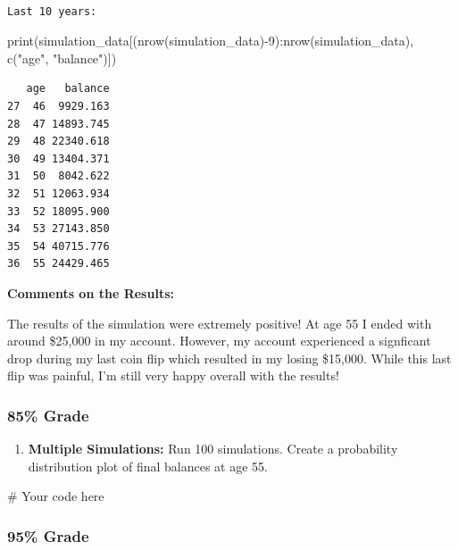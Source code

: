 \documentclass[
  letterpaper,
  DIV=11,
  numbers=noendperiod]{scrartcl}
\newenvironment{Shaded}{\begin{snugshade}}{\end{snugshade}}
\newcommand{\CommentTok}[1]{\textcolor[rgb]{0.37,0.37,0.37}{#1}}
\newcommand{\DecValTok}[1]{\textcolor[rgb]{0.68,0.00,0.00}{#1}}
\newcommand{\FunctionTok}[1]{\textcolor[rgb]{0.28,0.35,0.67}{#1}}
\newcommand{\NormalTok}[1]{\textcolor[rgb]{0.00,0.23,0.31}{#1}}
\newcommand{\SpecialCharTok}[1]{\textcolor[rgb]{0.37,0.37,0.37}{#1}}
\newcommand{\StringTok}[1]{\textcolor[rgb]{0.13,0.47,0.30}{#1}}
\providecommand{\tightlist}{%
  \setlength{\itemsep}{0pt}\setlength{\parskip}{0pt}}
\begin{document}
\begin{verbatim}

Last 10 years:
\end{verbatim}

\begin{Shaded}
\begin{Highlighting}[]
\FunctionTok{print}\NormalTok{(simulation\_data[(}\FunctionTok{nrow}\NormalTok{(simulation\_data)}\SpecialCharTok{{-}}\DecValTok{9}\NormalTok{)}\SpecialCharTok{:}\FunctionTok{nrow}\NormalTok{(simulation\_data), }\FunctionTok{c}\NormalTok{(}\StringTok{"age"}\NormalTok{, }\StringTok{"balance"}\NormalTok{)])}
\end{Highlighting}
\end{Shaded}

\begin{verbatim}
   age   balance
27  46  9929.163
28  47 14893.745
29  48 22340.618
30  49 13404.371
31  50  8042.622
32  51 12063.934
33  52 18095.900
34  53 27143.850
35  54 40715.776
36  55 24429.465
\end{verbatim}

\textbf{Comments on the Results:}

The results of the simulation were extremely positive! At age 55 I ended
with around \$25,000 in my account. However, my account experienced a
signficant drop during my last coin flip which resulted in my losing
\$15,000. While this last flip was painful, I'm still very happy overall
with the results!

\subsubsection{85\% Grade}\label{grade-1}

\begin{enumerate}
\def\labelenumi{\arabic{enumi}.}
\setcounter{enumi}{3}
\tightlist
\item
  \textbf{Multiple Simulations:} Run 100 simulations. Create a
  probability distribution plot of final balances at age 55.
\end{enumerate}

\begin{Shaded}
\begin{Highlighting}[]
\CommentTok{\# Your code here}
\end{Highlighting}
\end{Shaded}

\subsubsection{95\% Grade}\label{grade-2}
\end{document}

